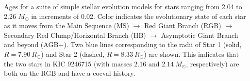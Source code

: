 \label{fig:mesa} Ages for a suite of simple stellar evolution models for stars ranging from 2.04 to 2.26 $M_{\odot}$ in increments of 0.02. Color indicates the evolutionary state of each star as it moves from the Main Sequence (MS) $\rightarrow$ Red Giant Branch (RGB) $\rightarrow$ Secondary Red Clump/Horizontal Branch (HB) $\rightarrow$ Asymptotic Giant Branch and beyond (AGB+). Two blue lines corresponding to the radii of Star 1 (solid, $R = 7.90 \ R_\odot$) and Star 2 (dashed, $R = 8.33 \ R_\odot$) are shown. This indicates that the two stars in KIC 9246715 (with masses $2.16$ and $2.14 \ M_\odot$, respectively) are both on the RGB and have a coeval history.

  
  
  
  
  
  
  